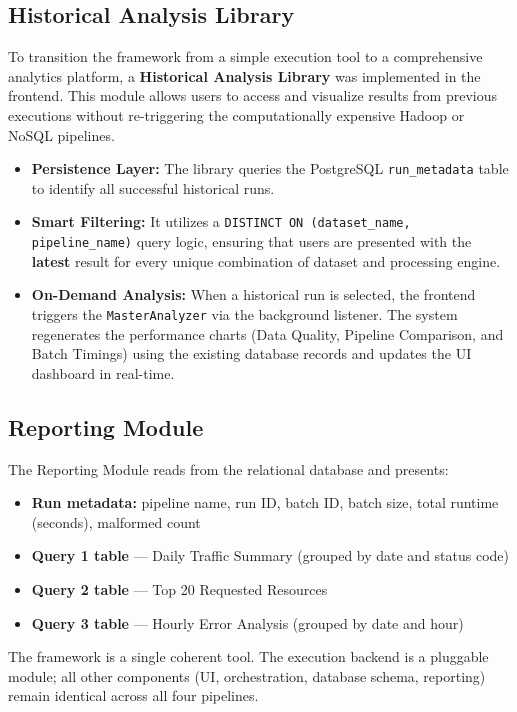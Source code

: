 \documentclass[11pt,a4paper]{article}
\begin{document}
\subsection{Historical Analysis Library}

To transition the framework from a simple execution tool to a comprehensive analytics platform, a \textbf{Historical Analysis Library} was implemented in the frontend. This module allows users to access and visualize results from previous executions without re-triggering the computationally expensive Hadoop or NoSQL pipelines.

\begin{itemize}
  \item \textbf{Persistence Layer:} The library queries the PostgreSQL \texttt{run\_metadata} table to identify all successful historical runs.
  \item \textbf{Smart Filtering:} It utilizes a \texttt{DISTINCT ON (dataset\_name, pipeline\_name)} query logic, ensuring that users are presented with the \textbf{latest} result for every unique combination of dataset and processing engine.
  \item \textbf{On-Demand Analysis:} When a historical run is selected, the frontend triggers the \texttt{MasterAnalyzer} via the background listener. The system regenerates the performance charts (Data Quality, Pipeline Comparison, and Batch Timings) using the existing database records and updates the UI dashboard in real-time.
\end{itemize}

\subsection{Reporting Module}

The Reporting Module reads from the relational database and presents:
\begin{itemize}
  \item \textbf{Run metadata:} pipeline name, run ID, batch ID, batch size, total runtime (seconds), malformed count
  \item \textbf{Query 1 table} --- Daily Traffic Summary (grouped by date and status code)
  \item \textbf{Query 2 table} --- Top 20 Requested Resources
  \item \textbf{Query 3 table} --- Hourly Error Analysis (grouped by date and hour)
\end{itemize}

\begin{notebox}
The framework is a single coherent tool. The execution backend is a pluggable module; all other components (UI, orchestration, database schema, reporting) remain identical across all four pipelines.
\end{notebox}
\end{document}
